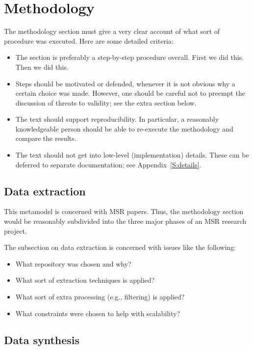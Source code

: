 \documentclass{llncs}
\begin{document}
 
\section{Methodology}

The methodology section must give a very clear account of what sort of
procedure was executed. Here are some detailed criteria:
%
\begin{itemize}
\item The section is preferably a step-by-step procedure overall. First we did
  this. Then we did this.
\item Steps should be motivated or defended, whenever it is not
  obvious why a certain choice was made. However, one should be
  careful not to preempt the discussion of threats to validity; see
  the extra section below.
\item The text should support reproducibility. In particular, a
  reasonably knowledgeable person should be able to re-execute the
  methodology and compare the results.
\item The text should not get into low-level (implementation)
  details. These can be deferred to separate documentation; see Appendix~\ref{S:details}.
\end{itemize}

\subsection{Data extraction}

This metamodel is concerned with MSR papers. Thus, the methodology
section would be reasonably subdivided into the three major phases of
an MSR research project.

The subsection on data extraction is concerned with issues like the
following:

\begin{itemize}
\item What repository was chosen and why?
\item What sort of extraction techniques is applied?
\item What sort of extra processing (e.g., filtering) is applied?
\item What constraints were chosen to help with scalability?
\end{itemize}

\subsection{Data synthesis}
\end{document}
